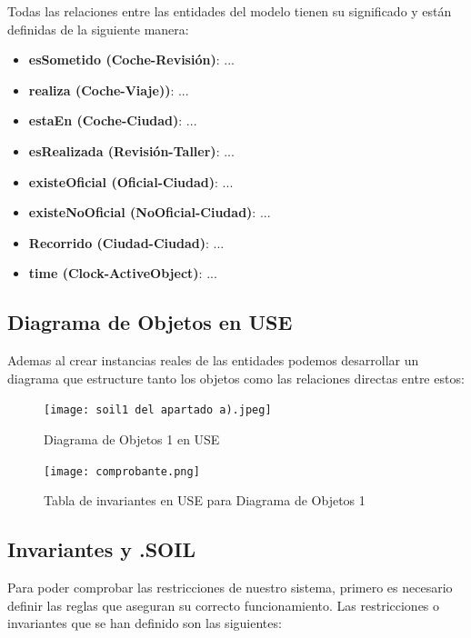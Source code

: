 \documentclass[12pt.a4paper]{article}
\begin{document}
Todas las relaciones entre las entidades del modelo tienen su significado y están definidas de la siguiente manera:
\begin{itemize}
\item \textbf{esSometido (Coche-Revisión)}: ...
  
\item \textbf{realiza (Coche-Viaje))}: ...

\item \textbf{estaEn (Coche-Ciudad)}: ...

\item \textbf{esRealizada (Revisión-Taller)}: ...

\item \textbf{existeOficial (Oficial-Ciudad)}: ...

\item \textbf{existeNoOficial (NoOficial-Ciudad)}: ...

\item \textbf{Recorrido (Ciudad-Ciudad)}: ...

\item \textbf{time (Clock-ActiveObject)}: ...
\end{itemize}

\vspace{1.0cm}

\subsection{Diagrama de Objetos en USE}
Ademas al crear instancias reales de las entidades podemos desarrollar un diagrama que estructure tanto los objetos como las relaciones directas entre estos:
\vspace{1.0cm}
\begin{figure}[H]
     \texttt{[image: soil1 del apartado a).jpeg]}
     \caption{Diagrama de Objetos 1 en USE}
     \label{Diagrama de Objetos 1 en USE}
\end{figure}

\begin{figure}[H]
     \texttt{[image: comprobante.png]}
     \caption{Tabla de invariantes en USE para Diagrama de Objetos 1}
     \label{Tabla de invariantes en USE para Diagrama de Objetos 1}
\end{figure}
\vspace{1.0cm}

\subsection{Invariantes y .SOIL}
Para poder comprobar las restricciones de nuestro sistema, primero es necesario definir las reglas que aseguran su correcto funcionamiento. Las restricciones o invariantes que se han definido son las siguientes:
\end{document}
